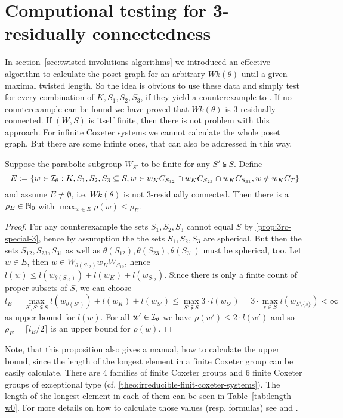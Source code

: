 \section{Computional testing for 3-residually connectedness}
\label{sec:3rc-compution-testing}

In section~\ref{sec:twisted-involutions-algorithms} we introduced an effective algorithm to calculate the poset graph for an arbitrary $Wk(\theta)$ until a given maximal twisted length. So the idea is obvious to use these data and simply test for every combination of $K,S_1,S_2,S_3$, if they yield a counterexample to . If no counterexample can be found we have proved that $Wk(\theta)$ is 3-residually connected. If $(W,S)$ is itself finite, then there is not problem with this approach. For infinite Coxeter systems we cannot calculate the whole poset graph. But there are some infinte ones, that can also be addressed in this way.

\begin{prop}
	Suppose the parabolic subgroup $W_{S'}$ to be finite for any $S' \subsetneqq S$. Define
	$$ E := \{ w \in \mathcal{I}_{\theta} : K,S_1,S_2,S_3 \subseteq S, w \in w_K C_{S_{12}} \cap w_K C_{S_{23}} \cap w_K C_{S_{31}}, w \notin w_K C_T \} $$
	and assume $E \neq \emptyset$, i.e. $Wk(\theta)$ is not 3-residually connected. Then there is a $\rho_E \in \mathbb{N}_0$ with $\max_{w \in E} \rho(w) \leq \rho_E$.

	\begin{proof}
		For any counterexample the sets $S_1,S_2,S_3$ cannot equal $S$ by \ref{prop:3rc-special-3}, hence by assumption the the sets $S_1,S_2,S_3$ are spherical. But then the sets $S_{12},S_{23},S_{31}$ as well as $\theta(S_{12}),\theta(S_{23}),\theta(S_{31})$ must be spherical, too. Let $w \in E$, then $w \in W_{\theta(S_{12})} w_K W_{S_{12}}$, hence $l(w) \leq l(w_{\theta(S_{12})}) + l(w_K) + l(w_{S_{12}})$. Since there is only a finite count of proper subsets of $S$, we can choose
		$$ l_E = \max_{K,S' \subsetneqq S} l(w_{\theta(S')}) + l(w_K) + l(w_{S'}) \leq \max_{S' \subsetneqq S} 3 \cdot l(w_{S'}) = 3 \cdot \max_{s \in S} l(w_{S \setminus \{s\}}) < \infty $$
		as upper bound for $l(w)$. For all $w' \in \mathcal{I}_{\theta}$ we have $\rho(w') \leq 2 \cdot l(w')$ and so $\rho_E = \lceil l_E/2 \rceil$ is an upper bound for $\rho(w)$.
	\end{proof}
\end{prop}

\begin{rema}
	Note, that this proposition also gives a manual, how to calculate the upper bound, since the length of the longest element in a finite Coxeter group can be easily calculate. There are 4 families of finite Coxeter groups and 6 finite Coxeter groups of exceptional type (cf. \ref{theo:irreducible-finit-coxeter-systems}). The length of the longest element in each of them can be seen in Table~\ref{tab:length-w0}. For more details on how to calculate those values (resp. formulas) see \cite[Section 1.2]{franzsen:automorphisms} and \cite[Section 2.11]{humphreys:coxeter}.
\end{rema}

